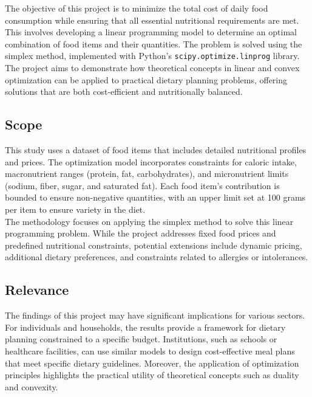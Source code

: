 \documentclass[10pt]{article}
\begin{document}
The objective of this project is to minimize the total cost of daily food consumption while ensuring that all essential nutritional requirements are met. This involves developing a linear programming model to determine an optimal combination of food items and their quantities. The problem is solved using the simplex method, implemented with Python’s \texttt{scipy.optimize.linprog} library.\\

The project aims to demonstrate how theoretical concepts in linear and convex optimization can be applied to practical dietary planning problems, offering solutions that are both cost-efficient and nutritionally balanced.


\subsection{Scope}

This study uses a dataset of food items that includes detailed nutritional profiles and prices. The optimization model incorporates constraints for caloric intake, macronutrient ranges (protein, fat, carbohydrates), and micronutrient limits (sodium, fiber, sugar, and saturated fat). Each food item's contribution is bounded to ensure non-negative quantities, with an upper limit set at 100 grams per item 
to ensure variety in the diet.\\

The methodology focuses on applying the simplex method to solve this linear programming problem. While the project addresses fixed food prices and predefined nutritional constraints, potential extensions include dynamic pricing, additional dietary preferences, and constraints related to allergies or intolerances.

\subsection{Relevance}

The findings of this project may have significant implications for various sectors. For individuals and households, the results provide a framework for dietary planning constrained to a specific budget. Institutions, such as schools or healthcare facilities, can use similar models to design cost-effective meal plans that meet specific dietary guidelines. Moreover, the application of optimization principles highlights the practical utility of theoretical concepts such as duality and convexity.\\
\end{document}
